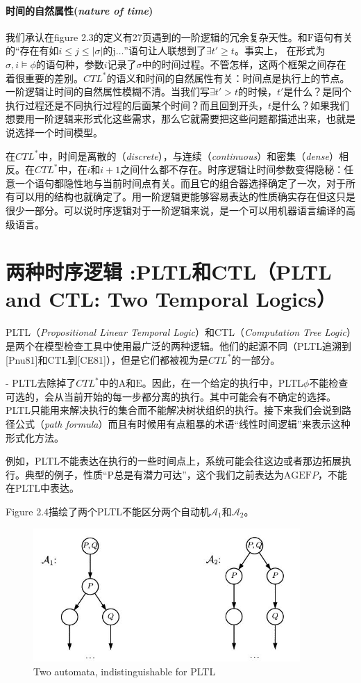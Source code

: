 \documentclass{book}
\begin{document}
    \paragraph{时间的自然属性({\itshape nature of time})} 我们承认在figure 2.3的定义有27页遇到的一阶逻辑的冗余复杂天性。和$\mathrm{F}$语句有关的“存在有如$i \leq j \leq |\sigma|$的j$\dots$”语句让人联想到了$\exists{t'}\geq t$。事实上， 在形式为$\sigma, i \models \phi$的语句种，参数$i$记录了$\sigma$中的时间过程。不管怎样，这两个框架之间存在着很重要的差别。$CTL^*$的语义和时间的自然属性有关：时间点是执行上的节点。一阶逻辑让时间的自然属性模糊不清。当我们写$\exists{t'}>t$的时候，$t'$是什么？是同个执行过程还是不同执行过程的后面某个时间？而且回到开头，$t$是什么？如果我们想要用一阶逻辑来形式化这些需求，那么它就需要把这些问题都描述出来，也就是说选择一个时间模型。

    在$CTL^*$中，时间是离散的（{\itshape discrete}），与连续（{\itshape continuous}）和密集（{\itshape dense}）相反。在$CTL^*$中，在$i$和$i+1$之间什么都不存在。时序逻辑让时间参数变得隐秘：任意一个语句都隐性地与当前时间点有关。而且它的组合器选择确定了一次，对于所有可以用的结构也就确定了。用一阶逻辑更能够容易表达的性质确实存在但这只是很少一部分。可以说时序逻辑对于一阶逻辑来说，是一个可以用机器语言编译的高级语言。

    \section{两种时序逻辑 :PLTL和CTL（PLTL and CTL: Two Temporal Logics）}

    PLTL（{\itshape Propositional Linear Temporal Logic}）和CTL（{\itshape Computation Tree Logic}）是两个在模型检查工具中使用最广泛的两种逻辑。他们的起源不同（PLTL追溯到[Pnu81]和CTL到[CE81]），但是它们都被视为是$CTL^*$的一部分。

    - PLTL去除掉了$CTL^*$中的$\mathrm{A}$和$\mathrm{E}$。因此，在一个给定的执行中，PLTL$\phi$不能检查可选的，会从当前开始的每一步都分离的执行。其中可能会有不确定的选择。PLTL只能用来解决执行的集合而不能解决树状组织的执行。接下来我们会说到路径公式（{\itshape path formula}）而且有时候用有点粗暴的术语“线性时间逻辑”来表示这种形式化方法。

    例如，PLTL不能表达在执行的一些时间点上，系统可能会往这边或者那边拓展执行。典型的例子，性质“P总是有潜力可达”，这个我们之前表达为$\mathrm{A}\mathrm{G}\mathrm{E}\mathrm{F}P$，不能在PLTL中表达。

    Figure 2.4描绘了两个PLTL不能区分两个自动机$\mathcal{A}_1$和$\mathcal{A}_2$。
    \begin{figure}
        \centering
        \includegraphics[width=4.0in,height=2.0in]{2_4.jpg}
        \caption{Two automata, indistinguishable for PLTL}
    \end{figure}
\end{document}
